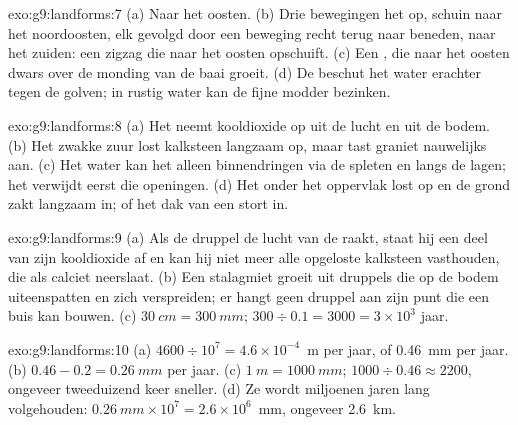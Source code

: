 \begin{solution}{exo:g9:landforms:7}
(a) Naar het oosten. (b) Drie bewegingen het  op, schuin naar het
noordoosten, elk gevolgd door een beweging recht terug naar beneden, naar
het zuiden: een zigzag die naar het oosten opschuift. (c) Een , die
naar het oosten dwars over de monding van de baai groeit. (d) De 
beschut het water erachter tegen de golven; in rustig water kan de fijne
modder bezinken.
\end{solution}

\begin{solution}{exo:g9:landforms:8}
(a) Het neemt kooldioxide op uit de lucht en uit de bodem. (b) Het zwakke
zuur lost kalksteen langzaam op, maar tast graniet nauwelijks aan. (c) Het
water kan het  alleen binnendringen via de spleten en langs de
lagen; het verwijdt eerst die openingen. (d) Het  onder het
oppervlak lost op en de grond zakt langzaam in; of het dak van een 
stort in.
\end{solution}

\begin{solution}{exo:g9:landforms:9}
(a) Als de druppel de lucht van de  raakt, staat hij een deel van zijn
kooldioxide af en kan hij niet meer alle opgeloste kalksteen vasthouden,
die als calciet neerslaat. (b) Een stalagmiet groeit uit druppels die op de
bodem uiteenspatten en zich verspreiden; er hangt geen druppel aan zijn
punt die een buis kan bouwen.
(c) $\qty{30}{cm} = \qty{300}{mm}$; $300 \div 0.1 = 3000 = 3 \times 10^3$
jaar.
\end{solution}

\begin{solution}{exo:g9:landforms:10}
(a) $4600 \div 10^7 = 4.6 \times 10^{-4}$~m per jaar, of \qty{0.46}{mm} per
jaar. (b) $0.46 - 0.2 = \qty{0.26}{mm}$ per jaar. (c) $\qty{1}{m} =
\qty{1000}{mm}$; $1000 \div 0.46 \approx 2200$, ongeveer tweeduizend keer
sneller. (d) Ze wordt miljoenen jaren lang volgehouden: $\qty{0.26}{mm} \times
10^7 = 2.6 \times 10^6$~mm, ongeveer \qty{2.6}{km}.
\end{solution}

